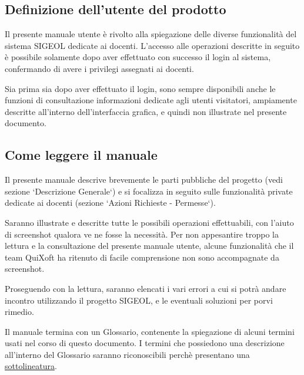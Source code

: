 \documentclass[11pt,a4paper]{article}
\begin{document}
\subsection{Definizione dell'utente del prodotto}
Il presente manuale utente è rivolto alla spiegazione delle diverse funzionalità del sistema SIGEOL dedicate ai docenti.
L'accesso alle operazioni descritte in seguito è possibile solamente dopo aver effettuato con successo il login al sistema, confermando di avere i privilegi assegnati ai docenti.

Sia prima sia dopo aver effettuato il login, sono sempre disponibili anche le funzioni di consultazione informazioni dedicate agli utenti visitatori, ampiamente descritte all'interno dell'interfaccia grafica, e quindi non illustrate nel presente documento.
\subsection{Come leggere il manuale}
Il presente manuale descrive brevemente le parti pubbliche del progetto (vedi sezione `Descrizione Generale`) e si focalizza in seguito sulle funzionalità private dedicate ai docenti (sezione `Azioni Richieste - Permesse`).

Saranno illustrate e descritte tutte le possibili operazioni effettuabili, con l'aiuto di screenshot qualora ve ne fosse la necessità.
Per non appesantire troppo la lettura e la consultazione del presente manuale utente, alcune funzionalità che il team QuiXoft ha ritenuto di facile comprensione non sono accompagnate da screenshot.

Proseguendo con la lettura, saranno elencati i vari errori a cui si potrà andare incontro utilizzando il progetto SIGEOL, e le eventuali soluzioni per porvi rimedio.

Il manuale termina con un Glossario, contenente la spiegazione di alcuni termini usati nel corso di questo documento.
I termini che possiedono una descrizione all'interno del Glossario saranno riconoscibili perchè presentano una \underline{sottolineatura}.
\end{document}
